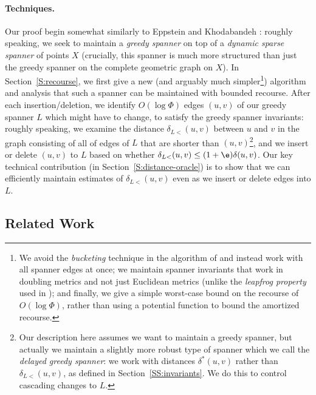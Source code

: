 \documentclass[11pt]{article}
\newcommand{\dist}{\ensuremath{\delta}}
\begin{document}
\paragraph{Techniques.} Our proof begin somewhat similarly to Eppstein and Khodabandeh \cite{EK24}: roughly speaking, we seek to maintain a \emph{greedy spanner} on top of a \emph{dynamic sparse spanner} of points $X$ (crucially, this spanner is much more structured than just the greedy spanner on the complete geometric graph on $X$). In Section~\ref{S:recourse}, we first give a new (and arguably much simpler\footnote{We avoid the \emph{bucketing} technique in the algorithm of \cite{EK24} and instead work with all spanner edges at once; we maintain spanner invariants that work in doubling metrics and not just Euclidean metrics (unlike the \emph{leapfrog property} used in \cite{EK24}); and finally, we give a simple worst-case bound on the recourse of $O(\log \Phi)$, rather than using a potential function to bound the amortized recourse.}) algorithm and analysis that such a spanner can be maintained with bounded recourse.
After each insertion/deletion, we identify $O(\log \Phi)$ edges $(u,v)$ of our greedy spanner $L$ which might have to change, to satisfy the greedy spanner invariants: roughly speaking, we examine the distance $\dist_{L<}(u,v)$ between $u$ and $v$ in the graph consisting of all of edges of $L$ that are shorter than $(u,v)$\footnote{Our description here assumes we want to maintain a greedy spanner, but actually we maintain a slightly more robust type of spanner which we call the \emph{delayed greedy spanner}: we work with distances $\dist^*(u,v)$ rather than $\dist_{L<}(u,v)$, as defined in Section~\ref{SS:invariants}. We do this to control cascading changes to $L$.}, and we insert or delete $(u,v)$ to $L$ based on whether $\dist_{L<}(u,v) \le (1+\e) \dist(u,v)$. Our key technical contribution  (in Section~\ref{S:distance-oracle}) is to show that we can efficiently maintain estimates of $\dist_{L<}(u,v)$ even as we insert or delete edges into $L$.



\subsection{Related Work} 
\label{SS:related-work}
\end{document}
